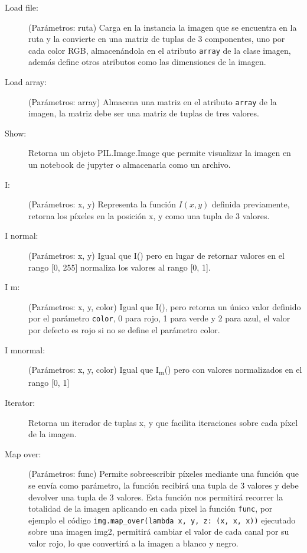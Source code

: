 \documentclass[letter]{article}
\begin{document}
\begin{description}
\item[{Load file:}] (Parámetros: ruta) Carga en la instancia la imagen que se
encuentra en la ruta y la convierte en una matriz de tuplas de 3 componentes,
uno por cada color RGB, almacenándola en el atributo \texttt{array} de la clase
imagen, además define otros atributos como las dimensiones de la imagen.

\item[{Load array:}] (Parámetros: array) Almacena una matriz en el atributo \texttt{array}
de la imagen, la matriz debe ser una matriz de tuplas de tres valores.

\item[{Show:}] Retorna un objeto PIL.Image.Image que permite visualizar la imagen en
un notebook de jupyter o almacenarla como un archivo.

\item[{I:}] (Parámetros: x, y) Representa la función \(I(x, y)\) definida previamente,
retorna los píxeles en la posición x, y como una tupla de 3 valores.

\item[{I normal:}] (Parámetros: x, y) Igual que I() pero en lugar de retornar
valores en el rango [0, 255] normaliza los valores al rango [0, 1].

\item[{I m:}] (Parámetros: x, y, color) Igual que I(), pero retorna un único valor
definido por el parámetro \texttt{color}, 0 para rojo, 1 para verde y 2 para azul, el
valor por defecto es rojo si no se define el parámetro color.

\item[{I mnormal:}] (Parámetros: x, y, color) Igual que I\textsubscript{m}() pero con valores
normalizados en el rango [0, 1]

\item[{Iterator:}] Retorna un iterador de tuplas x, y que facilita iteraciones
sobre cada píxel de la imagen.

\item[{Map over:}] (Parámetros: func) Permite sobreescribir píxeles mediante una
función que se envía como parámetro, la función recibirá una tupla de 3
valores y debe devolver una tupla de 3 valores. Esta función nos permitirá
recorrer la totalidad de la imagen aplicando en cada pixel la función \texttt{func},
por ejemplo el código \texttt{img.map\_over(lambda x, y, z: (x, x, x))} ejecutado
sobre una imagen img2, permitirá cambiar el valor de cada canal por su valor
rojo, lo que convertirá a la imagen a blanco y negro.
\end{description}
\end{document}
